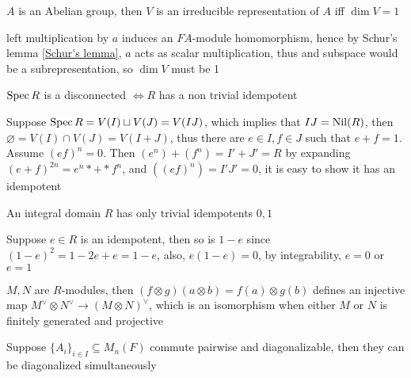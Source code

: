 \documentclass[main]{subfiles}
\begin{document}
\begin{exercise}
$A$ is an Abelian group, then $V$ is an irreducible representation of $A$ iff $\dim V=1$
\end{exercise}

\begin{solution}
left multiplication by $a$ induces an $FA$-module homomorphism, hence by Schur's lemma \ref{Schur's lemma}, $a$ acts as scalar multiplication, thus and subspace would be a subrepresentation, so $\dim V$ must be 1
\end{solution}

\begin{exercise}
$\operatorname{Spec} R$ is a disconnected $\iff R$ has a non trivial idempotent
\end{exercise}

\begin{solution}
Suppose $\operatorname{Spec} R=V(I)\sqcup V(J)=V(IJ)$, which implies that $IJ=\operatorname{Nil}(R)$, then $\varnothing=V(I)\cap V(J)=V(I+J)$, thus there are $e\in I,f\in J$ such that $e+f=1$. Assume $(ef)^n=0$. Then $(e^n)+(f^n)=I'+J'=R$ by expanding $(e+f)^{2n}=e^n*+*f^n$, and $((ef)^n)=I'J'=0$, it is easy to show it has an idempotent
\end{solution}

\begin{exercise}
An integral domain $R$ has only trivial idempotents $0,1$
\end{exercise}

\begin{solution}
Suppose $e\in R$ is an idempotent, then so is $1-e$ since $(1-e)^2=1-2e+e=1-e$, also, $e(1-e)=0$, by integrability, $e=0$ or $e=1$
\end{solution}

\begin{exercise}
$M,N$ are $R$-modules, then $(f\otimes g)(a\otimes b)=f(a)\otimes g(b)$ defines an injective map $M^\vee\otimes N^\vee\to(M\otimes N)^\vee$, which is an isomorphism when either $M$ or $N$ is finitely generated and projective
\end{exercise}

\begin{solution}

\end{solution}

\begin{exercise}
Suppose $\{A_i\}_{i\in I}\subseteq M_n(F)$ commute pairwise and diagonalizable, then they can be diagonalized simultaneously
\end{exercise}
\end{document}
